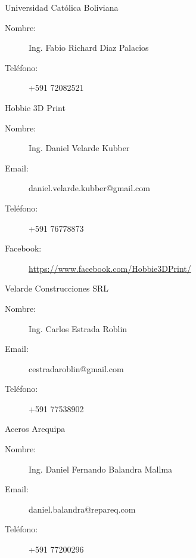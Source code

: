\documentclass[a4paper,10pt]{article}
\begin{document}
\begin{thebibliography}{}
 Universidad Católica Boliviana
  \begin{description}
    \item[Nombre:] Ing. Fabio Richard Diaz Palacios
    \item[Teléfono:] +591 72082521
  \end{description}

 Hobbie 3D Print
  \begin{description}
    \item[Nombre:] Ing. Daniel Velarde Kubber
    \item[Email:] daniel.velarde.kubber@gmail.com
    \item[Teléfono:] +591 76778873
    \item[Facebook:] \url{https://www.facebook.com/Hobbie3DPrint/}
  \end{description}

 Velarde Construcciones SRL
  \begin{description}
    \item[Nombre:] Ing. Carlos Estrada Roblin
    \item[Email:] cestradaroblin@gmail.com
    \item[Teléfono:] +591 77538902
  \end{description}

 Aceros Arequipa
  \begin{description}
    \item[Nombre:] Ing. Daniel Fernando Balandra Mallma
    \item[Email:] daniel.balandra@repareq.com
    \item[Teléfono:] +591 77200296
  \end{description}

\end{thebibliography}
\end{document}
